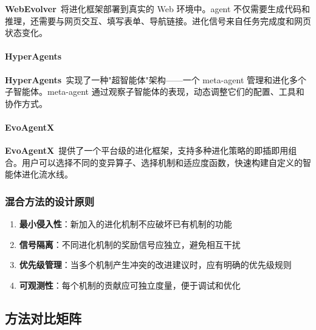 \textbf{WebEvolver}~\citep{webevolver2024}将进化框架部署到真实的 Web 环境中。agent 不仅需要生成代码和推理，还需要与网页交互、填写表单、导航链接。进化信号来自任务完成度和网页状态变化。

\paragraph{HyperAgents}

\textbf{HyperAgents}~\citep{hyperagents2024}实现了一种"超智能体"架构——一个 meta-agent 管理和进化多个子智能体。meta-agent 通过观察子智能体的表现，动态调整它们的配置、工具和协作方式。

\paragraph{EvoAgentX}

\textbf{EvoAgentX}~\citep{evoagentx2024}提供了一个平台级的进化框架，支持多种进化策略的即插即用组合。用户可以选择不同的变异算子、选择机制和适应度函数，快速构建自定义的智能体进化流水线。

\subsubsection{混合方法的设计原则}

\begin{enumerate}
\item \textbf{最小侵入性}：新加入的进化机制不应破坏已有机制的功能
\item \textbf{信号隔离}：不同进化机制的奖励信号应独立，避免相互干扰
\item \textbf{优先级管理}：当多个机制产生冲突的改进建议时，应有明确的优先级规则
\item \textbf{可观测性}：每个机制的贡献应可独立度量，便于调试和优化
\end{enumerate}

\subsection{方法对比矩阵}\label{sec:method-compare}

